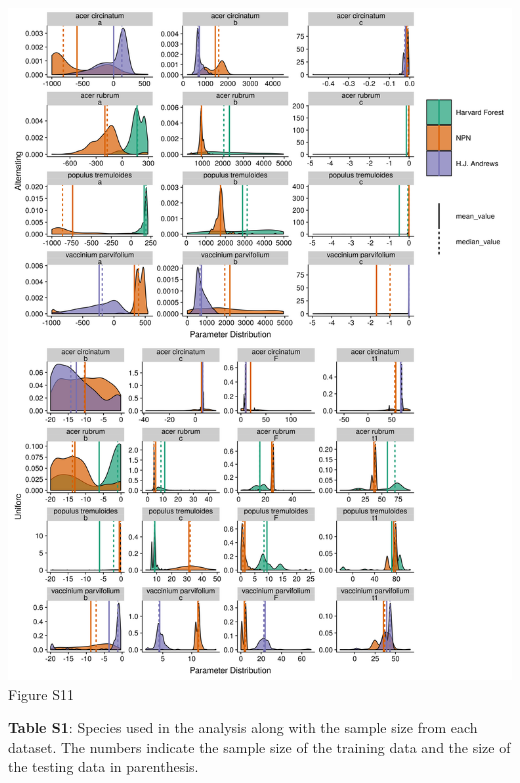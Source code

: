\documentclass[a4paper,12pt]{article}
\begin{document}
\begin{center}
	\centering
		\includegraphics[scale=0.5]{supplement_select_species_param_comparison2.png}
	Figure S11
\end{center}
\newpage

\textbf{Table S1}: Species used in the analysis along with the sample size from each dataset. The numbers indicate the sample size of the training data and the size of the testing data in parenthesis. 

\newpage
\end{document}
